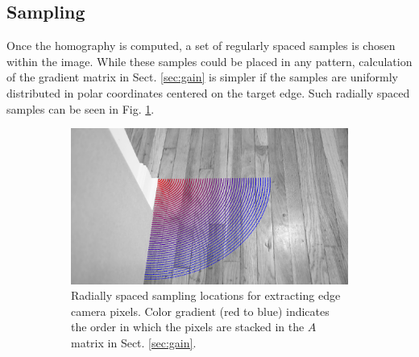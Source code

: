 \documentclass{article}
\begin{document}
\subsection{Sampling}

Once the homography is computed, a set of regularly spaced samples is chosen within the image. While these samples could be placed in any pattern, calculation of the gradient matrix in Sect. \ref{sec:gain} is simpler if the samples are uniformly distributed in polar coordinates centered on the target edge. Such radially spaced samples can be seen in Fig. \ref{fig:samples}.

\begin{figure}[htbp]
	\begin{subfigure}[t]{0.83\textwidth}
		\includegraphics[width=\textwidth]{img/samples.png}
		\caption{Radially spaced sampling locations for extracting edge camera pixels. Color gradient (red to blue) indicates the order in which the pixels are stacked in the $A$ matrix in Sect. \ref{sec:gain}.}
		\label{fig:samples}
	\end{subfigure}
	~
	\begin{subfigure}[t]{0.12\textwidth}

\end{subfigure}
\end{figure}
\end{document}
